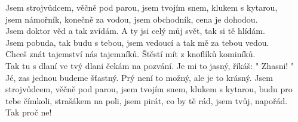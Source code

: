 \ve{}
Jsem strojvůdcem, věčně pod parou,
jsem tvojím snem, klukem s kytarou,\\
jsem námořník, konečně za vodou,
jsem obchodník, cena je dohodou.\\
Jsem doktor věd a tak zvídám.
A ty jsi celý můj svět, tak si tě hlídám.\\
Jsem pobuda, tak budu s tebou,
jsem vedoucí a tak mě za tebou vedou.\\
Chceš znát tajemství nás tajemníků.
Štěstí mít z knoflíků kominíků.\\
Tak tu s dlaní ve tvý dlani čekám na pozvání.
Je mi to jasný, říkáš: " Zhasni! "
\cho{}
Jé, zas jednou budeme šťastný.
Prý není to možný, ale je to krásný.
\ve{}
Jsem strojvůdcem, věčně pod parou,
jsem tvojím snem, klukem s kytarou,
budu pro tebe čímkoli, strašákem na poli,
jsem pirát, co by tě rád,
jsem tvůj, napořád.
\cho{}
\\ Tak proč ne!

\esong
